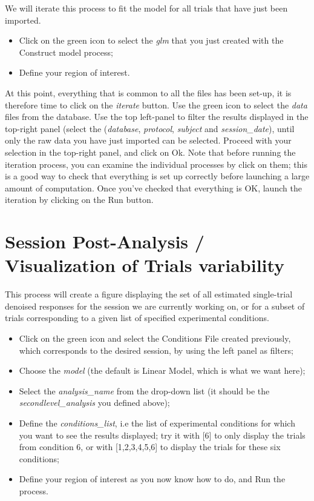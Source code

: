 We will iterate this process to fit the model for all trials that have just been imported.

\begin{itemize}
  \item Click on the green icon to select the \textit{glm} that you just created with the Construct model process;
  \item Define your region of interest.
\end{itemize}

At this point, everything that is common to all the files has been set-up, it is therefore time to click on the \textit{iterate} button.
Use the green icon to select the \textit{data} files from the database.
Use the top left-panel to filter the results displayed in the top-right panel (select the (\textit{database}, \textit{protocol}, \textit{subject} and \textit{session\_date}), until only the raw data you have just imported can be selected. Proceed with your selection in the top-right panel, and click on Ok. Note that before running the iteration process, you can examine the individual processes by click on them; this is a good way to check that everything is set up correctly before launching a large amount of computation. Once you've checked that everything is OK, launch the iteration by clicking on the Run button.


\section{Session Post-Analysis / Visualization of Trials variability}

This process will create a figure displaying the set of all estimated single-trial denoised responses for the session we are currently working on, or for a subset of trials corresponding to a given list of specified experimental conditions.

\begin{itemize}
  \item Click on the green icon and select the Conditions File created previously, which corresponds to the desired session, by
using the left panel as filters;
  \item Choose the \textit{model} (the default is Linear Model, which is what we want here);
  \item Select the \textit{analysis\_name} from the drop-down list (it should be the \textit{secondlevel\_analysis} you defined above);
  \item Define the \textit{conditions\_list}, i.e the list of experimental conditions for which you want to see the results displayed; try it with [6] to only display the trials from condition 6, or with [1,2,3,4,5,6] to display the trials for these six conditions;
  \item Define your region of interest as you now know how to do, and Run the process.
\end{itemize}

